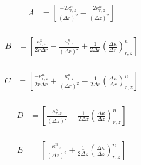\documentclass[12pt]{article}
\begin{document}
\begin{equation}
  \begin{aligned}
    A &= \left [\frac{-2\kappa^n_{r, z}}{(\Delta r)^2} -\frac{2\kappa^n_{r, z}}{(\Delta z)^2}  \right ] \\
  \end{aligned}
\end{equation}

\begin{equation}
  \begin{aligned}
    B &= \left [\frac{\kappa^n_{r, z}}{2r\Delta r} + \frac{\kappa^n_{r, z}}{(\Delta r)^2} + \frac{1}{2\Delta r}(\frac{\Delta\kappa}{\Delta r})^n_{r, z} \right ] \\
  \end{aligned}
\end{equation}

\begin{equation}
  \begin{aligned}
    C &= \left [\frac{-\kappa^n_{r, z}}{2r\Delta r} + \frac{\kappa^n_{r, z}}{(\Delta r)^2} - \frac{1}{2\Delta r}(\frac{\Delta\kappa}{\Delta r})^n_{r, z} \right ] \\
  \end{aligned}
\end{equation}

\begin{equation}
  \begin{aligned}
    D &= \left [\frac{\kappa^n_{r, z}}{(\Delta z)^2} - \frac{1}{2\Delta z}(\frac{\Delta\kappa}{\Delta z})^n_{r, z}  \right ] \\
  \end{aligned}
\end{equation}

\begin{equation}
  \begin{aligned}
    E &= \left [ \frac{\kappa^n_{r, z}}{(\Delta z)^2} + \frac{1}{2\Delta z}(\frac{\Delta\kappa}{\Delta z})^n_{r, z} \right ] \\
  \end{aligned}
\end{equation}
\end{document}
